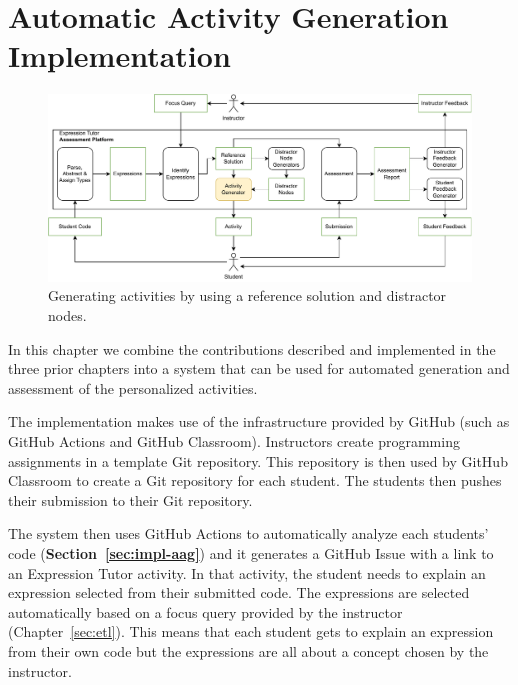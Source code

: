 \chapter{Automatic Activity Generation Implementation}\label{sec:impl}

\begin{chapterBody}

\begin{figure}[ht]
    \centering
    \includegraphics[width=\textwidth]{res/6/et_loop_ag.pdf}
    \caption{Generating activities by using a reference solution and
distractor nodes.}
    \label{fig:ag-intro-loop}
\end{figure}

In this chapter we combine the contributions described and implemented in the
three prior chapters into a system that can be used for automated generation and 
assessment of the personalized activities.

The implementation makes use of the infrastructure provided by GitHub (such
as GitHub Actions and GitHub Classroom). Instructors create programming
assignments in a template Git repository. This repository is then used by
GitHub Classroom to create a Git repository for each student. The students then
pushes their submission to their Git repository.

The system then uses GitHub Actions to automatically analyze each
students' code \hfill\break (\textbf{Section~\ref{sec:impl-aag}}) and it
generates a GitHub Issue with a link to an Expression Tutor activity.
In that activity, the student needs to explain an expression selected from their
submitted code.
The expressions are selected automatically based on a focus query provided by
the instructor (Chapter~\ref{sec:etl}).
This means that each student gets to explain an expression from their own code
but the expressions are all about a concept chosen by the instructor.


\end{chapterBody}
